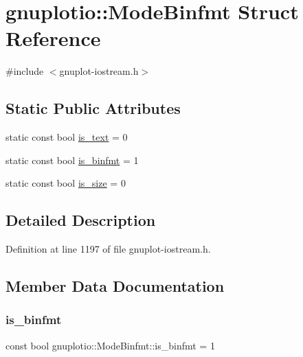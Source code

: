 \hypertarget{structgnuplotio_1_1_mode_binfmt}{}\section{gnuplotio\+:\+:Mode\+Binfmt Struct Reference}
\label{structgnuplotio_1_1_mode_binfmt}


{\ttfamily \#include $<$gnuplot-\/iostream.\+h$>$}

\subsection*{Static Public Attributes}
\begin{DoxyCompactItemize}
\item 
static const bool \hyperlink{structgnuplotio_1_1_mode_binfmt_a7ab187fe922cac23b0d39ade81e5eb56}{is\+\_\+text} = 0
\item 
static const bool \hyperlink{structgnuplotio_1_1_mode_binfmt_ab0d5d3718364cdea0347f93ec121d841}{is\+\_\+binfmt} = 1
\item 
static const bool \hyperlink{structgnuplotio_1_1_mode_binfmt_a40a5a8ee815d6a5e9a3c30c8290a6967}{is\+\_\+size} = 0
\end{DoxyCompactItemize}


\subsection{Detailed Description}


Definition at line 1197 of file gnuplot-\/iostream.\+h.



\subsection{Member Data Documentation}
\mbox{\label{structgnuplotio_1_1_mode_binfmt_ab0d5d3718364cdea0347f93ec121d841}} 
\subsubsection{\texorpdfstring{is\+\_\+binfmt}{is\_binfmt}}
{\footnotesize\ttfamily const bool gnuplotio\+::\+Mode\+Binfmt\+::is\+\_\+binfmt = 1\hspace{0.3cm}{\ttfamily [static]}}



